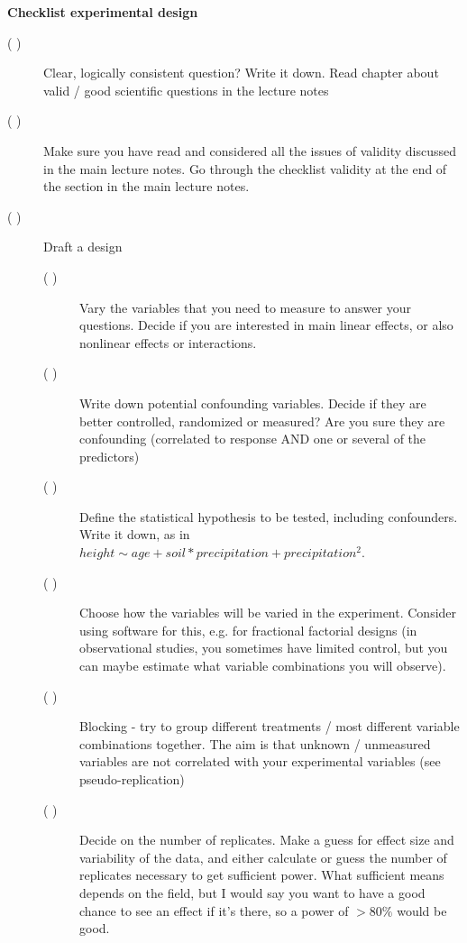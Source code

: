 \documentclass[a4paper,twoside]{tufte-book}\usepackage[]{graphicx}\usepackage[]{color}
\begin{document}
\newpage
\begin{mdframed}
    
\textbf{Checklist experimental design}

\begin{description}

\item[( )] Clear, logically consistent question? Write it down. Read chapter about valid / good scientific questions in the lecture notes

\item[( )] Make sure you have read and considered all the issues of validity discussed in the main lecture notes. Go through the checklist validity at the end of the section in the main lecture notes.

\item[( )] Draft a design

  \begin{description}

  \item[( )] Vary the variables that you need to measure to answer your questions. Decide if you are interested in main linear effects, or also nonlinear effects or interactions. 
  
  \item[( )] Write down potential confounding variables. Decide if they are better controlled, randomized or measured? Are you sure they are confounding (correlated to response AND one or several of the predictors)
  
  \item[( )] Define the statistical hypothesis to be tested, including confounders. Write it down, as in $height  \sim age + soil * precipitation + precipitation^2$. 
  
  \item[( )] Choose how the variables will be varied in the experiment. Consider using software for this, e.g. for fractional factorial designs (in observational studies, you sometimes have limited control, but you can maybe estimate what variable combinations you will observe).
  
  \item[( )] Blocking - try to group different treatments / most different variable combinations together. The aim is that unknown / unmeasured variables are not correlated with your experimental variables (see pseudo-replication)
  
  \item[( )] Decide on the number of replicates. Make a guess for effect size and variability of the data, and either calculate or guess the number of replicates necessary to get sufficient power. What sufficient means depends on the field, but I would say you want to have a good chance to see an effect if it's there, so a power of $>80\%$ would be good. 
  

\end{description}
\end{description}
\end{mdframed}
\end{document}
